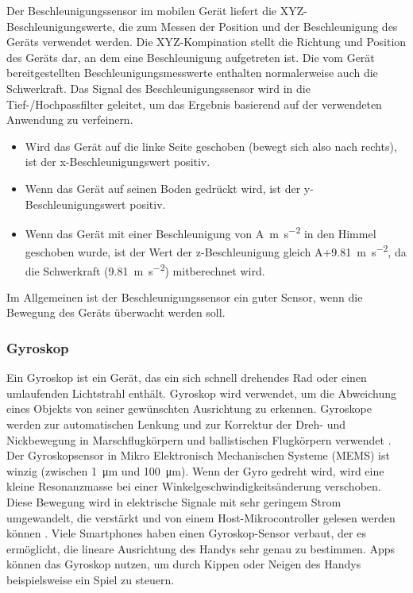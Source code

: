 Der Beschleunigungssensor im mobilen Gerät liefert die XYZ-Beschleunigungswerte, die zum Messen der Position und der Beschleunigung des Geräts verwendet werden. Die XYZ-Kompination stellt die Richtung und Position des Geräts dar, an dem eine Beschleunigung aufgetreten ist. Die vom Gerät bereitgestellten Beschleunigungsmesswerte enthalten normalerweise auch die Schwerkraft. Das Signal des Beschleunigungssensor wird in die Tief-/Hochpassfilter geleitet, um das Ergebnis basierend auf der verwendeten Anwendung zu verfeinern. \citep{Sathish2021}
\begin{itemize}
	\item Wird das Gerät auf die linke Seite geschoben (bewegt sich also nach rechts), ist der x-Beschleunigungswert positiv.
	\item Wenn das Gerät auf seinen Boden gedrückt wird, ist der y-Beschleunigungswert positiv.
	\item Wenn das Gerät mit einer Beschleunigung von A\SI[per-mode = symbol]{}{\meter\per\square\second} in den Himmel geschoben wurde, ist der Wert der z-Beschleunigung gleich A+\SI[per-mode = symbol]{ 9,81}{\meter\per\square\second}, da die Schwerkraft (\SI[per-mode = symbol]{9,81}{\meter\per\square\second}) mitberechnet wird.
\end{itemize}
Im Allgemeinen ist der Beschleunigungssensor ein guter Sensor, wenn die Bewegung des Geräts überwacht werden soll. \citep{DevelopersMotionSen}

%
%
%
%
\subsubsection{Gyroskop}

Ein Gyroskop ist ein Gerät, das ein sich schnell drehendes Rad oder einen umlaufenden Lichtstrahl enthält. Gyroskop wird verwendet, um die Abweichung eines Objekts von seiner gewünschten Ausrichtung zu erkennen. Gyroskope werden zur automatischen Lenkung und zur Korrektur der Dreh- und Nickbewegung in Marschflugkörpern und ballistischen Flugkörpern verwendet \citep{RogersGyro}.
Der Gyroskopsensor in Mikro Elektronisch Mechanischen Systeme (MEMS) ist winzig (zwischen \SI{1}{\micro\meter} und \SI{100}{\micro\meter}). Wenn der Gyro gedreht wird, wird eine kleine Resonanzmasse bei einer Winkelgeschwindigkeitsänderung verschoben. Diese Bewegung wird in elektrische Signale mit sehr geringem Strom umgewandelt, die verstärkt und von einem Host-Mikrocontroller gelesen werden können \citep{sparkfunGyro}.
Viele Smartphones haben einen Gyroskop-Sensor verbaut, der es ermöglicht, die lineare Ausrichtung des Handys sehr genau zu bestimmen. Apps können das Gyroskop nutzen, um durch Kippen oder Neigen des Handys beispielsweise ein Spiel zu steuern.

